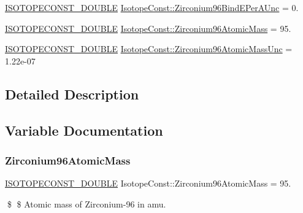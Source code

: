 \begin{DoxyCompactItemize}
\mbox{\hyperlink{group___isotope_const-_macros_ga8f45a7272ce02c0b4c65c44636ed719a}{I\+S\+O\+T\+O\+P\+E\+C\+O\+N\+S\+T\+\_\+\+D\+O\+U\+B\+LE}} \mbox{\hyperlink{group___isotope_const-_zirconium-_zr96_gab5f8b8350128365eea14696ddc675cca}{Isotope\+Const\+::\+Zirconium96\+Bind\+E\+Per\+A\+Unc}} = 0.
\item 
\mbox{\hyperlink{group___isotope_const-_macros_ga8f45a7272ce02c0b4c65c44636ed719a}{I\+S\+O\+T\+O\+P\+E\+C\+O\+N\+S\+T\+\_\+\+D\+O\+U\+B\+LE}} \mbox{\hyperlink{group___isotope_const-_zirconium-_zr96_ga748f26339b558f4317983db1775fcfff}{Isotope\+Const\+::\+Zirconium96\+Atomic\+Mass}} = 95.
\item 
\mbox{\hyperlink{group___isotope_const-_macros_ga8f45a7272ce02c0b4c65c44636ed719a}{I\+S\+O\+T\+O\+P\+E\+C\+O\+N\+S\+T\+\_\+\+D\+O\+U\+B\+LE}} \mbox{\hyperlink{group___isotope_const-_zirconium-_zr96_ga86358b021c7974d5a34406724231b957}{Isotope\+Const\+::\+Zirconium96\+Atomic\+Mass\+Unc}} = 1.\+22e-\/07
\end{DoxyCompactItemize}


\subsection{Detailed Description}


\subsection{Variable Documentation}
\mbox{\label{group___isotope_const-_zirconium-_zr96_ga748f26339b558f4317983db1775fcfff}} 
\subsubsection{\texorpdfstring{Zirconium96\+Atomic\+Mass}{Zirconium96AtomicMass}}
{\footnotesize\ttfamily \mbox{\hyperlink{group___isotope_const-_macros_ga8f45a7272ce02c0b4c65c44636ed719a}{I\+S\+O\+T\+O\+P\+E\+C\+O\+N\+S\+T\+\_\+\+D\+O\+U\+B\+LE}} Isotope\+Const\+::\+Zirconium96\+Atomic\+Mass = 95.}

\$ \$ Atomic mass of Zirconium-\/96 in amu. \mbox{\label{group___isotope_const-_zirconium-_zr96_ga86358b021c7974d5a34406724231b957}} 
